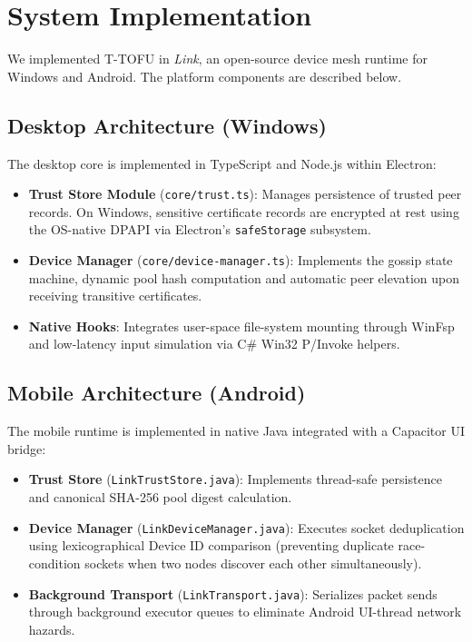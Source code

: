 \documentclass[conference,a4paper]{IEEEtran}
\begin{document}
\section{System Implementation}

We implemented T-TOFU in \textit{Link}, an open-source device mesh runtime for Windows and Android. The platform components are described below.

\subsection{Desktop Architecture (Windows)}
The desktop core is implemented in TypeScript and Node.js within Electron:
\begin{itemize}
    \item \textbf{Trust Store Module} (\texttt{core/trust.ts}): Manages persistence of trusted peer records. On Windows, sensitive certificate records are encrypted at rest using the OS-native DPAPI via Electron's \texttt{safeStorage} subsystem.
    \item \textbf{Device Manager} (\texttt{core/device-manager.ts}): Implements the gossip state machine, dynamic pool hash computation and automatic peer elevation upon receiving transitive certificates.
    \item \textbf{Native Hooks}: Integrates user-space file-system mounting through WinFsp \cite{winfsp} and low-latency input simulation via C\# Win32 P/Invoke helpers.
\end{itemize}

\subsection{Mobile Architecture (Android)}
The mobile runtime is implemented in native Java integrated with a Capacitor UI bridge:
\begin{itemize}
    \item \textbf{Trust Store} (\texttt{LinkTrustStore.java}): Implements thread-safe persistence and canonical SHA-256 pool digest calculation.
    \item \textbf{Device Manager} (\texttt{LinkDeviceManager.java}): Executes socket deduplication using lexicographical Device ID comparison (preventing duplicate race-condition sockets when two nodes discover each other simultaneously).
    \item \textbf{Background Transport} (\texttt{LinkTransport.java}): Serializes packet sends through background executor queues to eliminate Android UI-thread network hazards.
\end{itemize}
\end{document}
